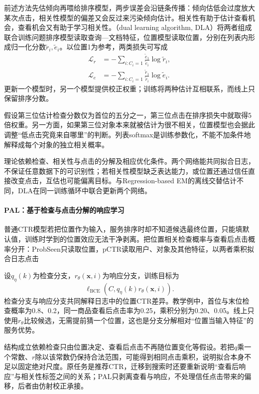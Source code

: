 前述方法先估倾向再喂给排序模型，两步误差会沿链条传播：倾向估低会过度放大某次点击，相关性模型的偏差又会反过来污染倾向估计。相关性有助于估计查看机会，查看机会又有助于学习相关性。（dual learning algorithm, DLA）将两者组成联合训练问题排序模型读取查询—文档特征，位置模型读取位置，分别在列表内形成归一化分数$\widetilde r_i,\widetilde e_i$。以位置1为参考，两类损失可写成
\begin{align}
 \mathcal L_r&=-\sum_{i:C_i=1}
       \frac{\widetilde e_1}{\widetilde e_i}\log\widetilde r_i,\\
 \mathcal L_e&=-\sum_{i:C_i=1}
       \frac{\widetilde r_1}{\widetilde r_i}\log\widetilde e_i.
 \label{eq:rs-dla}
\end{align}
更新一个模型时，另一个模型提供校正权重；训练将两种估计互相联系，而线上只保留排序分数。

假设第三位估计检查分数仅为首位的五分之一，第三位点击在排序损失中就取得5倍权重。另一方面，如果第三位对象本来就被估计为很不相关，位置模型也会据此调整“低点击究竟来自哪里”的判断。列表softmax是训练参数化，不能不加条件地解释成每个对象的独立相关概率。

理论依赖检查、相关性与点击的分解及相应优化条件。两个网络能共同拟合日志，不保证任意数据下的可识别性；若相关性模型缺乏表达能力，或位置还通过信任直接改变点击，互估也可能偏离目标。与Regression-based EM的离线交替估计不同，DLA在同一训练循环中联合更新两个网络。

\paragraph{PAL：基于检查与点击分解的响应学习}
\label{sec:rs-pal}

普通CTR模型若把位置作为输入，服务排序时却不知道候选最终位置，只能填默认值，训练时学到的位置效应无法干净剥离。把位置相关检查概率与查看后点击概率分开：ProbSeen只读取位置，pCTR读取用户、对象及其他特征，以两者乘积拟合日志点击

设$q_\eta(k)$为检查分支，$r_\theta(\bm x,i)$为响应分支，训练目标为
\[
 \ell_{\mathrm{BCE}}\!\left(C,q_\eta(k)r_\theta(\bm x,i)\right).
\]
检查分支与响应分支共同解释日志中的位置CTR差异。教学例中，首位与末位检查概率为0.8、0.2，同一商品查看后点击率为0.25，乘积分别为0.20、0.05。线上只使用$r_\theta$比较候选，无需提前猜一个位置，这也是分支分解相对“位置当输入特征”的服务优势。

结构成立依赖检查只由位置决定、查看后点击不再随位置变化等假设。若把$q$乘一个常数、$r$除以该常数仍保持合法范围，可能得到相同点击乘积，说明拟合本身不足以固定绝对尺度。原任务是推荐CTR，迁移到搜索时还要重新说明“查看后响应”与相关性标签之间的关系；PAL只剥离查看与响应，不处理信任点击带来的偏移，后者由仿射校正承接。

